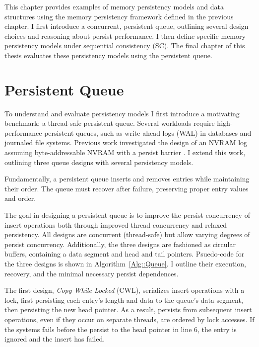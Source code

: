 This chapter provides examples of memory persistency models and data structures using the memory persistency framework defined in the previous chapter.
I first introduce a concurrent, persistent queue, outlining several design choices and reasoning about persist performance.
I then define specific memory persistency models under sequential consistency (SC).
The final chapter of this thesis evaluates these persistency models using the persistent queue.

\section{Persistent Queue}
\label{sec:PersistencyModels:Queue}

To understand and evaluate persistency models I first introduce a motivating benchmark: a thread-safe persistent queue.
Several workloads require high-performance persistent queues, such as write ahead logs (WAL) in databases and journaled file systems.
Previous work investigated the design of an NVRAM log assuming byte-addressable NVRAM with a persist barrier \cite{FangHsiao11}.
I extend this work, outlining three queue designs with several persistency models.

Fundamentally, a persistent queue inserts and removes entries while maintaining their order.
The queue must recover after failure, preserving proper entry values and order.

The goal in designing a persistent queue is to improve the persist concurrency of insert operations both through improved thread concurrency and relaxed persistency.
All designs are concurrent (thread-safe) but allow varying degrees of persist concurrency.
Additionally, the three designs are fashioned as circular buffers, containing a data segment and head and tail pointers.
Psuedo-code for the three designs is shown in Algorithm~\ref{Alg::Queue}.
I outline their execution, recovery, and the minimal necessary persist dependences.



The first design, \emph{Copy While Locked} (CWL), serializes insert operations with a lock, first persisting each entry's length and data to the queue's data segment, then persisting the new head pointer.
As a result, persists from subsequent insert operations, even if they occur on separate threads, are ordered by lock accesses.
If the systems fails before the persist to the head pointer in line 6, the entry is ignored and the insert has failed.

